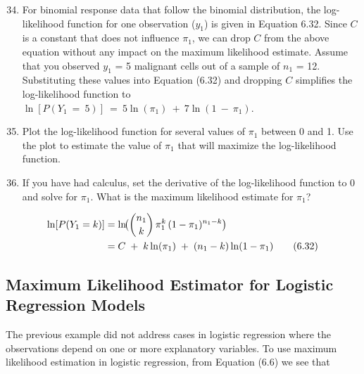 \documentclass[
]{report}
\begin{document}
\begin{enumerate}
  \setcounter{enumi}{33}
  \item For binomial response data that follow the binomial distribution, the log-likelihood function for one observation ($\scriptstyle y_1$) is given in Equation 6.32. Since $\scriptstyle C$ is a constant that does not influence $\scriptstyle \pi_1$, we can drop $\scriptstyle C$ from the above equation without any impact on the maximum likelihood estimate. Assume that you observed $\scriptstyle y_1$ = 5 malignant cells out of a sample of $\scriptstyle n_1$ = 12. Substituting these values into Equation (6.32) and dropping $\scriptstyle C$ simplifies the log-likelihood function to $\scriptstyle \ln[P(Y_1 \ = \ 5)] \ = \ 5\ln(\pi_1) \ + \  7\ln(1  \ - \ \pi_1).$

  \item  Plot the log-likelihood function for several values of $\scriptstyle \pi_1$ between 0 and 1. Use the plot to estimate the value of $\scriptstyle \pi_1$ that will maximize the log-likelihood function. 
  
  \item If you have had calculus, set the derivative of the log-likelihood function to 0 and solve for $\scriptstyle \pi_1$. What is the maximum likelihood estimate for $\scriptstyle \pi_1$?

\end{enumerate}

\begin{align}
\ln[P(Y_1 = k)]
&= \ln\!\bigl(\binom{n_1}{k}\,\pi_1^k\,(1 - \pi_1)^{n_1 - k}\bigr) \notag \\
&= C \;+\;k\ln(\pi_1)\;+\;(n_1 - k)\ln(1 - \pi_1)
\tag{6.32}
\end{align}

\hypertarget{maximum-likelihood-estimator-for-logistic-regression-models}{%
\subsection*{Maximum Likelihood Estimator for Logistic Regression Models}\label{maximum-likelihood-estimator-for-logistic-regression-models}}

The previous example did not address cases in logistic regression where the observations depend on one or more explanatory variables. To use maximum likelihood estimation in logistic regression, from Equation (6.6) we see that
\end{document}
